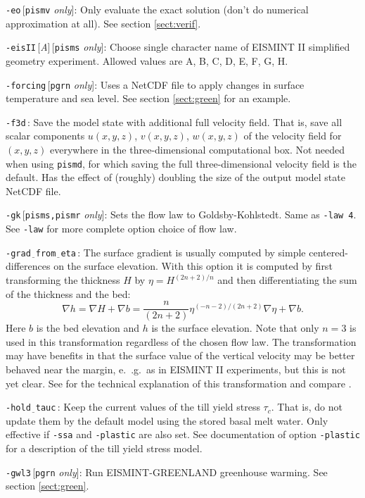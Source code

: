 \documentclass[11pt,final]{amsart}
\newcommand{\grad}{\nabla}
\newcommand{\rawopt}[1]{\vspace{1mm}\noindent \large\texttt{-#1}\normalsize}
\newcommand{\opt}[1]{\rawopt{#1}\,:\quad}
\newcommand{\optrestrict}[2]{\rawopt{#1}\,[\texttt{#2} \textsl{only}]:\quad}
\newcommand{\optdefrestrict}[3]{\rawopt{#1}\,[\textsl{#2}]\,[\texttt{#3} \textsl{only}]:\quad}
\newcommand{\und}{$\underline{\,\,\,}$}
\begin{document}
\optrestrict{eo}{pismv}  Only evaluate the exact solution (don't do numerical approximation at all).  See section \ref{sect:verif}.

\optdefrestrict{eisII}{A}{pisms}  Choose single character name of EISMINT II \cite{EISMINT00} simplified geometry experiment.  Allowed values are A, B, C, D, E, F, G, H.

\optrestrict{forcing}{pgrn}    Uses a NetCDF file to apply changes in surface temperature and sea level. See section \ref{sect:green} for an example.

\opt{f3d}  Save the model state with additional full velocity field.  That is, save all scalar components $u(x,y,z)$, $v(x,y,z)$, $w(x,y,z)$ of the velocity field for $(x,y,z)$ everywhere in the three-dimensional computational box.  Not needed when using \verb|pismd|, for which saving the full three-dimensional velocity field is the default.  Has the effect of (roughly) doubling the size of the output model state NetCDF file.

\optrestrict{gk}{pisms,pismr}  Sets the flow law to Goldsby-Kohlstedt.  Same as \verb|-law 4|.  See \verb|-law| for more complete option choice of flow law.

\opt{grad\und from\und eta}  The surface gradient is usually computed by simple centered-differences on the surface elevation.  With this option it is computed by first transforming the thickness $H$ by $\eta = H^{(2n+2)/n}$ and then differentiating the sum of the thickness and the bed:
	$$\grad h = \grad H + \grad b = \frac{n}{(2n+2)} \eta^{(-n-2)/(2n+2)} \nabla \eta + \nabla b.$$
Here $b$ is the bed elevation and $h$ is the surface elevation.  Note that only $n=3$ is used in this transformation regardless of the chosen flow law.  The transformation may have benefits in that the surface value of the vertical velocity may be better behaved near the margin, e.~.g.~as in EISMINT II experiments, but this is not yet clear.  See \cite{CDDSV} for the technical explanation of this transformation and compare \cite{SaitoMargin}.

\opt{hold\und tauc}    Keep the current values of the till yield stress $\tau_c$.  That is, do not update them by the default model using the stored basal melt water.  Only effective if \verb|-ssa| and \verb|-plastic| are also set.  See documentation of option \verb|-plastic| for a description of the till yield stress model.

\optrestrict{gwl3}{pgrn}    Run EISMINT-GREENLAND greenhouse warming. See section \ref{sect:green}.
\end{document}
